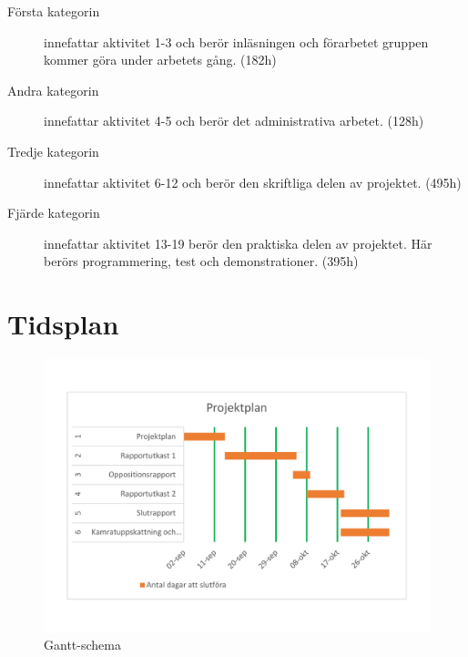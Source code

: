 \documentclass[a4paper]{article}
\begin{document}

\begin{description}
    \item[Första kategorin] innefattar aktivitet 1-3 och berör inläsningen och förarbetet gruppen kommer göra under arbetets gång. (182h)
    
    \item[Andra kategorin] innefattar aktivitet 4-5 och berör det administrativa arbetet. (128h)
    
    \item[Tredje kategorin] innefattar aktivitet 6-12 och berör den skriftliga delen av projektet. (495h)
    
    \item[Fjärde kategorin] innefattar aktivitet 13-19 berör den praktiska delen av projektet. Här berörs programmering, test och demonstrationer. (395h)
    
    \end{description}


\section{Tidsplan}
\begin{figure}[H]
    \includegraphics[width=\textwidth]{Gantschema.pdf}
    \caption{Gantt-schema}
    \label{figure:gantt}
\end{figure}
\end{document}

